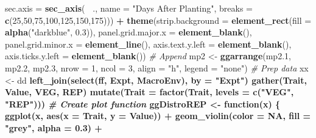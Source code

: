 \documentclass[
]{article}
\newenvironment{Shaded}{\begin{snugshade}}{\end{snugshade}}
\newcommand{\CommentTok}[1]{\textcolor[rgb]{0.56,0.35,0.01}{\textit{#1}}}
\newcommand{\ControlFlowTok}[1]{\textcolor[rgb]{0.13,0.29,0.53}{\textbf{#1}}}
\newcommand{\DataTypeTok}[1]{\textcolor[rgb]{0.13,0.29,0.53}{#1}}
\newcommand{\DecValTok}[1]{\textcolor[rgb]{0.00,0.00,0.81}{#1}}
\newcommand{\FloatTok}[1]{\textcolor[rgb]{0.00,0.00,0.81}{#1}}
\newcommand{\KeywordTok}[1]{\textcolor[rgb]{0.13,0.29,0.53}{\textbf{#1}}}
\newcommand{\NormalTok}[1]{#1}
\newcommand{\OperatorTok}[1]{\textcolor[rgb]{0.81,0.36,0.00}{\textbf{#1}}}
\newcommand{\OtherTok}[1]{\textcolor[rgb]{0.56,0.35,0.01}{#1}}
\newcommand{\StringTok}[1]{\textcolor[rgb]{0.31,0.60,0.02}{#1}}
\begin{document}
\begin{Shaded}
\begin{Highlighting}[]
{{{{{{{{{{{                     \DataTypeTok{sec.axis =} \KeywordTok{sec_axis}\NormalTok{(}\OperatorTok{~}\StringTok{ }\NormalTok{., }\DataTypeTok{name =} \StringTok{"Days After Planting"}\NormalTok{,}
                       \DataTypeTok{breaks =} \KeywordTok{c}\NormalTok{(}\DecValTok{25}\NormalTok{,}\DecValTok{50}\NormalTok{,}\DecValTok{75}\NormalTok{,}\DecValTok{100}\NormalTok{,}\DecValTok{125}\NormalTok{,}\DecValTok{150}\NormalTok{,}\DecValTok{175}\NormalTok{))) }\OperatorTok{+}
\StringTok{  }\KeywordTok{theme}\NormalTok{(}\DataTypeTok{strip.background =} \KeywordTok{element_rect}\NormalTok{(}\DataTypeTok{fill =} \KeywordTok{alpha}\NormalTok{(}\StringTok{"darkblue"}\NormalTok{, }\FloatTok{0.3}\NormalTok{)),}
        \DataTypeTok{panel.grid.major.x =} \KeywordTok{element_blank}\NormalTok{(),}
        \DataTypeTok{panel.grid.minor.x =} \KeywordTok{element_line}\NormalTok{(),}
        \DataTypeTok{axis.text.y.left =} \KeywordTok{element_blank}\NormalTok{(),}
        \DataTypeTok{axis.ticks.y.left =} \KeywordTok{element_blank}\NormalTok{())}
\CommentTok{# Append}
\NormalTok{mp2 <-}\StringTok{ }\KeywordTok{ggarrange}\NormalTok{(mp2}\FloatTok{.1}\NormalTok{, mp2}\FloatTok{.2}\NormalTok{, mp2}\FloatTok{.3}\NormalTok{, }\DataTypeTok{nrow =} \DecValTok{1}\NormalTok{, }\DataTypeTok{ncol =} \DecValTok{3}\NormalTok{, }\DataTypeTok{align =} \StringTok{"h"}\NormalTok{, }\DataTypeTok{legend =} \StringTok{"none"}\NormalTok{)}
\CommentTok{# Prep data}
\NormalTok{xx <-}\StringTok{ }\NormalTok{dd }\OperatorTok{%
\StringTok{  }\KeywordTok{left_join}\NormalTok{(}\KeywordTok{select}\NormalTok{(ff, Expt, MacroEnv), }\DataTypeTok{by =} \StringTok{"Expt"}\NormalTok{) }\OperatorTok{%
\StringTok{  }\KeywordTok{gather}\NormalTok{(Trait, Value, VEG, REP) }\OperatorTok{%
\StringTok{  }\KeywordTok{mutate}\NormalTok{(}\DataTypeTok{Trait =} \KeywordTok{factor}\NormalTok{(Trait, }\DataTypeTok{levels =} \KeywordTok{c}\NormalTok{(}\StringTok{"VEG"}\NormalTok{, }\StringTok{"REP"}\NormalTok{)))}
\CommentTok{# Create plot function}
\NormalTok{ggDistroREP <-}\StringTok{ }\ControlFlowTok{function}\NormalTok{(x) \{}
  \KeywordTok{ggplot}\NormalTok{(x, }\KeywordTok{aes}\NormalTok{(}\DataTypeTok{x =}\NormalTok{ Trait, }\DataTypeTok{y =}\NormalTok{ Value)) }\OperatorTok{+}\StringTok{ }
\StringTok{    }\KeywordTok{geom_violin}\NormalTok{(}\DataTypeTok{color =} \OtherTok{NA}\NormalTok{, }\DataTypeTok{fill =} \StringTok{"grey"}\NormalTok{, }\DataTypeTok{alpha =} \FloatTok{0.3}\NormalTok{) }\OperatorTok{+}\StringTok{ }
}}}}}}}}}}}}}}
\end{Highlighting}
\end{Shaded}
\end{document}

